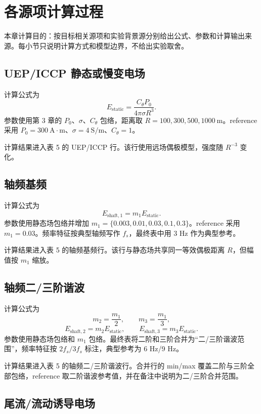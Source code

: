 \section{各源项计算过程}

本章计算目的：按目标相关源项和实验背景源分别给出公式、参数和计算输出来源。每小节只说明计算方式和模型边界，不给出实验取舍。

\subsection{UEP/ICCP 静态或慢变电场}

计算公式为
\[
E_{\mathrm{static}}=\frac{C_\theta P_0}{4\pi\sigma R^3}.
\]
参数使用第 3 章的 $P_0$、$\sigma$、$C_\theta$ 包络，距离取 $R=100,300,500,1000\ \mathrm{m}$。reference 采用 $P_0=300\ \mathrm{A\cdot m}$、$\sigma=4\ \mathrm{S/m}$、$C_\theta=1$。

计算结果进入表 5 的 UEP/ICCP 行。该行使用远场偶极模型，强度随 $R^{-3}$ 变化。

\subsection{轴频基频}

计算公式为
\[
E_{\mathrm{shaft},1}=m_1E_{\mathrm{static}}.
\]
参数使用静态场包络并增加 $m_1=\{0.003,0.01,0.03,0.1,0.3\}$。reference 采用 $m_1=0.03$。频率特征按典型轴频写作 $f_s$，最终表中用 3 Hz 作为典型参考。

计算结果进入表 5 的轴频基频行。该行与静态场共享同一等效偶极距离 $R$，但幅值按 $m_1$ 缩放。

\subsection{轴频二/三阶谐波}

计算公式为
\[
m_2=\frac{m_1}{2},\qquad m_3=\frac{m_1}{3},
\]
\[
E_{\mathrm{shaft},2}=m_2E_{\mathrm{static}},\qquad
E_{\mathrm{shaft},3}=m_3E_{\mathrm{static}}.
\]
参数使用静态场包络和 $m_1$ 包络。最终表将二阶和三阶合并为“二/三阶谐波范围”，频率特征按 $2f_s/3f_s$ 标注，典型参考为 6 Hz/9 Hz。

计算结果进入表 5 的轴频二/三阶谐波行。合并行的 min/max 覆盖二阶与三阶全部包络，reference 取二阶谐波参考值，并在备注中说明为二/三阶合并范围。

\subsection{尾流/流动诱导电场}

